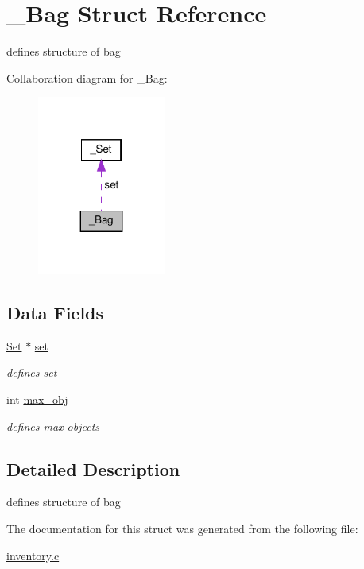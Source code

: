 \hypertarget{struct__Bag}{}\section{\+\_\+\+Bag Struct Reference}
\label{struct__Bag}


defines structure of bag  




Collaboration diagram for \+\_\+\+Bag\+:
\nopagebreak
\begin{figure}[H]
\begin{center}
\leavevmode
\includegraphics[width=119pt]{struct__Bag__coll__graph}
\end{center}
\end{figure}
\subsection*{Data Fields}
\begin{DoxyCompactItemize}
\item 
\mbox{\label{struct__Bag_a07df3f3b358ee3a3f65223f25a4565f6}} 
\hyperlink{set_8h_a6d3b7f7c92cbb4577ef3ef7ddbf93161}{Set} $\ast$ \hyperlink{struct__Bag_a07df3f3b358ee3a3f65223f25a4565f6}{set}
\begin{DoxyCompactList}\small\item\em defines set \end{DoxyCompactList}\item 
\mbox{\label{struct__Bag_ad644d22c425628ddeb1a7c6da0a0fdeb}} 
int \hyperlink{struct__Bag_ad644d22c425628ddeb1a7c6da0a0fdeb}{max\+\_\+obj}
\begin{DoxyCompactList}\small\item\em defines max objects \end{DoxyCompactList}\end{DoxyCompactItemize}


\subsection{Detailed Description}
defines structure of bag 

The documentation for this struct was generated from the following file\+:\begin{DoxyCompactItemize}
\item 
\hyperlink{inventory_8c}{inventory.\+c}\end{DoxyCompactItemize}
